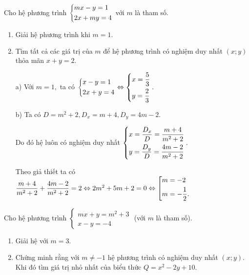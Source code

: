 \begin{bt}%
	Cho hệ phương trình $ \left\{\begin{aligned}& mx-y=1 \\ & 2x+my=4\end{aligned}\right.$ với $m$ là tham số.
	\begin{enumerate}
		\item  Giải hệ phương trình khi $m = 1$.
		\item Tìm tất cả các giá trị của $m$ để hệ phương trình có nghiệm duy nhất $(x;y)$ thỏa mãn $x + y = 2.$
	\end{enumerate}
	\loigiai
	{
		\begin{enumerate}
			\item[a)] Với $m=1,$ ta có  $ \left\{\begin{aligned}& x-y=1 \\ & 2x+y=4\end{aligned}\right. \Leftrightarrow \left\{\begin{aligned}& x = \dfrac{5}{3} \\ & y = \dfrac{2}{3}\end{aligned}\right..$ 
			\item[b)]  Ta có $D = m^2+2, D_x = m+4, D_y = 4m-2$. 
			
			Do đó hệ luôn có nghiệm duy nhất $\left\{\begin{aligned} & x = \dfrac{D_x}{D}=\dfrac{m+4}{m^2+2} \\ & y = \dfrac{D_y}{D} = \dfrac{4m-2}{m^2+2}\end{aligned}\right.. $
			
			Theo giả thiết ta có $\dfrac{m+4}{m^2+2}+  \dfrac{4m-2}{m^2+2}= 2 \Leftrightarrow 2m^2 +5m+2=0 \Leftrightarrow \left[\begin{aligned}& m = -2 \\& m = -\dfrac{1}{2}.\end{aligned}\right.$
		\end{enumerate}
	}
\end{bt}

\begin{bt}%
	Cho hệ phương trình   $\begin{cases}mx+y=m^2+3 \\ x-y=-4  \end{cases} $  (với $m$ là tham số).
	\begin{enumerate}
		\item Giải hệ với $m=3$.
		\item Chứng minh rằng với $m\neq -1$ hệ phương trình có nghiệm duy nhất $(x;y)$. Khi đó tìm giá trị nhỏ nhất của biểu thức $Q=x^2-2y+10.$
	\end{enumerate} 
	
\end{bt}

